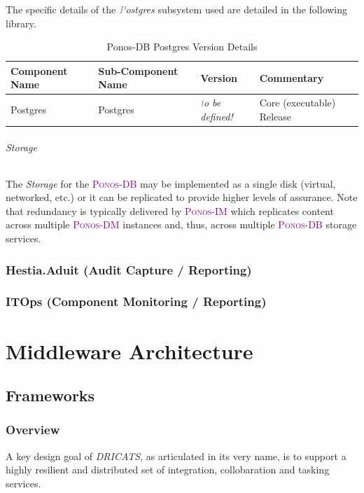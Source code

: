 \documentclass[a4paper]{book}
\newcommand{\ponosim}{\textsc{\textcolor{Purple}{\small{Ponos-IM }}}}
\newcommand{\ponosdm}{\textsc{\textcolor{Purple}{\small{Ponos-DM }}}}
\newcommand{\ponosdb}{\textsc{\textcolor{Purple}{\small{Ponos-DB }}}}
\newcommand{\postgres}{\textit{\textcolor{gray}Postgres }}
\newcommand{\postgresversion}{\textit{\textcolor{gray}to be defined!}}
\begin{document}
The specific details of the \postgres subsystem used are detailed in the following library.
\begin{table}[h!]
    \begin{center}
    \small{
    \begin{tabular}{ || l | l  | l | l || }
        \hline
        \textbf{Component Name} & \textbf{Sub-Component Name} & \textbf{Version} & \textbf{Commentary} \\
        \hline
        Postgres & Postgres & \postgresversion & Core (executable) Release\\
        \hline
    \end{tabular}
    }
    \caption{Ponos-DB Postgres Version Details}
    \end{center}
\end{table}




\subparagraph{Storage}

The \textit{Storage} for the \ponosdb may be implemented as a single disk (virtual, networked, etc.) or it can be replicated to provide higher levels of assurance. Note that redundancy is typically delivered by \ponosim which replicates content across multiple \ponosdm instances and, thus, across multiple \ponosdb storage services.

\subsection{Hestia.Aduit (Audit Capture / Reporting)}

\subsection{ITOps (Component Monitoring / Reporting)}

\chapter{Middleware Architecture}
\section{Frameworks}
\subsection{Overview}

A key design goal of \textit{DRICATS}, as articulated in its very name, is to support a highly resilient and distributed set of integration, collobaration and tasking services.
\end{document}
